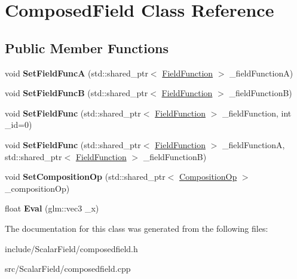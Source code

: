 \hypertarget{classComposedField}{}\section{Composed\+Field Class Reference}
\label{classComposedField}
\subsection*{Public Member Functions}
\begin{DoxyCompactItemize}
\item 
void {\bfseries Set\+Field\+FuncA} (std\+::shared\+\_\+ptr$<$ \hyperlink{classFieldFunction}{Field\+Function} $>$ \+\_\+field\+FunctionA)\hypertarget{classComposedField_ae08818f972e64dd8203d47f5b9ab3ab1}{}\label{classComposedField_ae08818f972e64dd8203d47f5b9ab3ab1}

\item 
void {\bfseries Set\+Field\+FuncB} (std\+::shared\+\_\+ptr$<$ \hyperlink{classFieldFunction}{Field\+Function} $>$ \+\_\+field\+FunctionB)\hypertarget{classComposedField_a35d305aa29bbdf99aa102bdf6229bc5f}{}\label{classComposedField_a35d305aa29bbdf99aa102bdf6229bc5f}

\item 
void {\bfseries Set\+Field\+Func} (std\+::shared\+\_\+ptr$<$ \hyperlink{classFieldFunction}{Field\+Function} $>$ \+\_\+field\+Function, int \+\_\+id=0)\hypertarget{classComposedField_acc1c3b0394bbef687d98af2ac599baaa}{}\label{classComposedField_acc1c3b0394bbef687d98af2ac599baaa}

\item 
void {\bfseries Set\+Field\+Func} (std\+::shared\+\_\+ptr$<$ \hyperlink{classFieldFunction}{Field\+Function} $>$ \+\_\+field\+FunctionA, std\+::shared\+\_\+ptr$<$ \hyperlink{classFieldFunction}{Field\+Function} $>$ \+\_\+field\+FunctionB)\hypertarget{classComposedField_a886f23c15fb922593166f96205434b65}{}\label{classComposedField_a886f23c15fb922593166f96205434b65}

\item 
void {\bfseries Set\+Composition\+Op} (std\+::shared\+\_\+ptr$<$ \hyperlink{classCompositionOp}{Composition\+Op} $>$ \+\_\+composition\+Op)\hypertarget{classComposedField_a36da55ccfcb30aff5b4c61612a2f2a7a}{}\label{classComposedField_a36da55ccfcb30aff5b4c61612a2f2a7a}

\item 
float {\bfseries Eval} (glm\+::vec3 \+\_\+x)\hypertarget{classComposedField_af86aa0b8541b7c40116bd71850201903}{}\label{classComposedField_af86aa0b8541b7c40116bd71850201903}

\end{DoxyCompactItemize}


The documentation for this class was generated from the following files\+:\begin{DoxyCompactItemize}
\item 
include/\+Scalar\+Field/composedfield.\+h\item 
src/\+Scalar\+Field/composedfield.\+cpp\end{DoxyCompactItemize}
